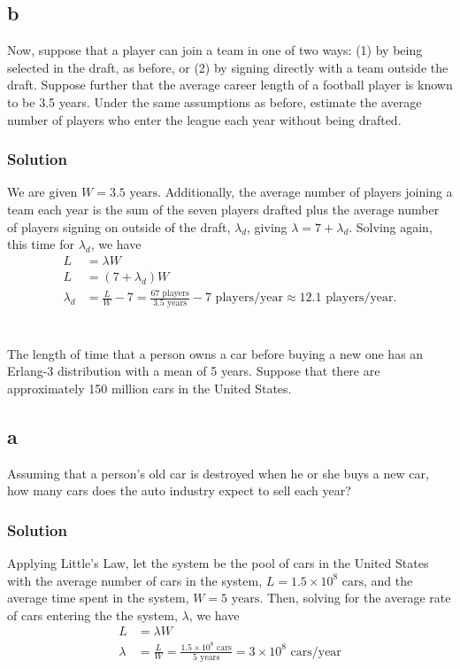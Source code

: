 \documentclass[letterpaper]{amsart}
\begin{document}
\subsection*{b}
Now, suppose that a player can join a team in one of two ways: (1) by
being selected in the draft, as before, or (2) by signing directly with a
team outside the draft. Suppose further that the average career length of
a football player is known to be 3.5 years. Under the same assumptions
as before, estimate the average number of players who enter the league
each year without being drafted.
\subsubsection*{Solution}
We are given $W = 3.5 \text{ years}$. Additionally, the average
number of players joining a team each year is the sum of the seven players
drafted plus the average number of players signing on outside of the draft,
$\lambda_d$, giving $\lambda = 7+\lambda_d$. Solving again, this time for $\lambda_d$, we have
\begin{align}
  L &= \lambda W \\
  L &= (7 + \lambda_d) W \\
  \lambda_d &= \frac{L}{W}-7 = \frac{67 \text{ players}}{3.5 \text{ years}}
              - 7\text{ players/year}\approx 12.1\text{ players/year}.
\end{align}

\section{} %
The length of time that a person owns a car before buying a new one has an Erlang-3
distribution with a mean of 5 years. Suppose that there are approximately 150 million
cars in the United States.

\subsection*{a}
Assuming that a person's old car is destroyed when he or she buys a new car,
how many cars does the auto industry expect to sell each year?
\subsubsection*{Solution}
Applying Little's Law, let the system be the pool of cars in the United States
with the average number of cars in the system, $L=1.5\times10^8\text{ cars}$, and the
average time spent in the system, $W=5 \text{ years}$. Then, solving for the
average rate of cars entering the the system, $\lambda$, we have
\begin{align}
  L &= \lambda W \\
  \lambda &= \frac{L}{W} = \frac{1.5\times10^8\text{ cars}}{5 \text{ years}} = 3\times10^8\text{ cars/year}
\end{align}
\end{document}
